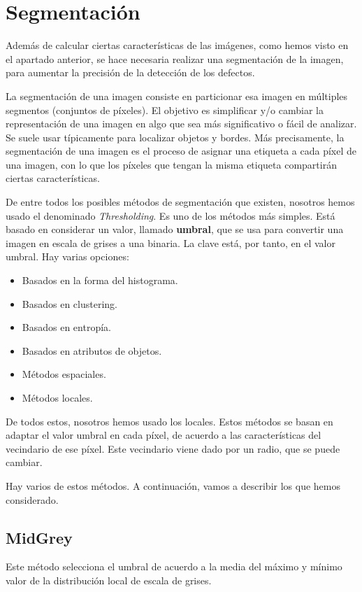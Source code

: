 

\section{Segmentación}
Además de calcular ciertas características de las imágenes, como hemos visto en el apartado anterior, se hace necesaria realizar una segmentación de la imagen, para aumentar la precisión de la detección de los defectos.

La segmentación de una imagen consiste en particionar esa imagen en múltiples segmentos (conjuntos de píxeles). El objetivo es simplificar y/o cambiar la representación de una imagen en algo que sea más significativo o fácil de analizar. Se suele usar típicamente para localizar objetos y bordes. Más precisamente, la segmentación de una imagen es el proceso de asignar una etiqueta a cada píxel de una imagen, con lo que los píxeles que tengan la misma etiqueta compartirán ciertas características.

De entre todos los posibles métodos de segmentación que existen, nosotros hemos usado el denominado \textit{Thresholding}. Es uno de los métodos más simples. Está basado en considerar un valor, llamado \textbf{umbral}, que se usa para convertir una imagen en escala de grises a una binaria. La clave está, por tanto, en el valor umbral. Hay varias opciones:

\begin{itemize}
\item Basados en la forma del histograma.
\item Basados en clustering.
\item Basados en entropía.
\item Basados en atributos de objetos.
\item Métodos espaciales.
\item Métodos locales.
\end{itemize}

De todos estos, nosotros hemos usado los locales. Estos métodos se basan en adaptar el valor umbral en cada píxel, de acuerdo a las características del vecindario de ese píxel. Este vecindario viene dado por un radio, que se puede cambiar.

Hay varios de estos métodos. A continuación, vamos a describir los que hemos considerado.

\subsection{MidGrey}
Este método selecciona el umbral de acuerdo a la media del máximo y mínimo valor de la distribución local de escala de grises.

